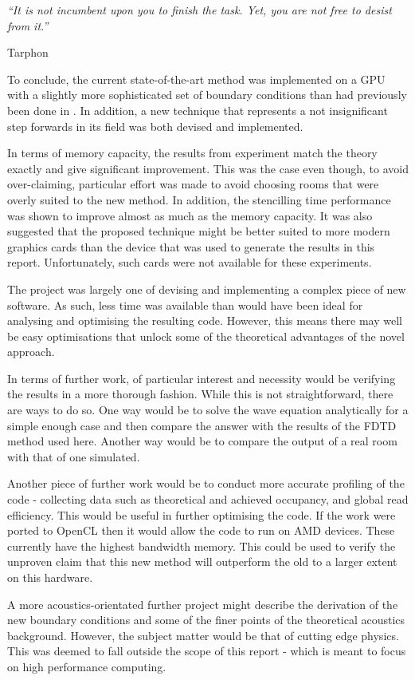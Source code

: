 \documentclass[12pt,a4paper]{report}
\begin{document}
\epigraph{\itshape ``It is not incumbent upon you to finish the task. Yet, you are not free to desist from it.''}{Tarphon}

To conclude, the current state-of-the-art method was implemented on a GPU with a slightly more sophisticated set of boundary conditions than had previously been done in \cite{craig}. In addition, a new technique that represents a not insignificant step forwards in its field was both devised and implemented.

In terms of memory capacity, the results from experiment match the theory exactly and give significant improvement. This was the case even though, to avoid over-claiming, particular effort was made to avoid choosing rooms that were overly suited to the new method. In addition, the stencilling time performance was shown to improve almost as much as the memory capacity. It was also suggested that the proposed technique might be better suited to more modern graphics cards than the device that was used to generate the results in this report. Unfortunately, such cards were not available for these experiments.

The project was largely one of devising and implementing a complex piece of new software. As such, less time was available than would have been ideal for analysing and optimising the resulting code. However, this means there may well be easy optimisations that unlock some of the theoretical advantages of the novel approach.

In terms of further work, of particular interest and necessity would be verifying the results in a more thorough fashion. While this is not straightforward, there are ways to do so. One way would be to solve the wave equation analytically for a simple enough case and then compare the answer with the results of the FDTD method used here. Another way would be to compare the output of a real room with that of one simulated.

Another piece of further work would be to conduct more accurate profiling of the code - collecting data such as theoretical and achieved occupancy, and global read efficiency. This would be useful in further optimising the code. If the work were ported to OpenCL then it would allow the code to run on AMD devices. These currently have the highest bandwidth memory. This could be used to verify the unproven claim that this new method will outperform the old to a larger extent on this hardware.

A more acoustics-orientated further project might describe the derivation of the new boundary conditions and some of the finer points of the theoretical acoustics background. However, the subject matter would be that of cutting edge physics. This was deemed to fall outside the scope of this report - which is meant to focus on high performance computing.
\end{document}
